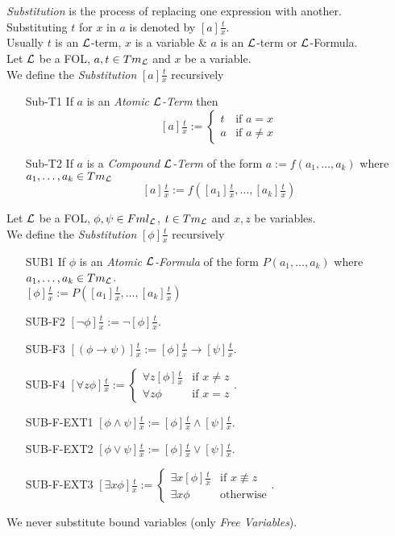 \documentclass[11pt,a4paper]{article}
\begin{document}
\textit{Substitution} is the process of replacing one expression with another.\\
Substituting $t$ for $x$ in $a$ is denoted by $[a]\frac{t}x$.\\
\nb Usually $t$ is an $\mathcal{L}$-term, $x$ is a variable \& $a$ is an $\mathcal{L}$-term or $\mathcal{L}$-Formula.\\

Let $\mathcal{L}$ be a FOL, $a,t\in Tm_{\mathcal{L}}$ and $x$ be a variable.\\
We define the \textit{Substitution} $[a]\frac{t}{x}$ recursively
\begin{itemize}
	\item[Sub-T1] If $a$ is an \textit{Atomic $\mathcal{L}$-Term} then
	$$[a]\tfrac{t}{x}:=\begin{cases}t&\text{if }a=x\\a&\text{if }a\neq x\end{cases}$$
	\item[Sub-T2] If $a$ is a \textit{Compound $\mathcal{L}$-Term} of the form $a:=f(a_1,\dots,a_k)$ where $a_1,\dots,a_k\in Tm_{\mathcal{L}}$
	$$[a]\tfrac{t}x:=f\left([a_1]\tfrac{t}x,\dots,[a_k]\tfrac{t}x\right)$$
\end{itemize}


Let $\mathcal{L}$ be a FOL, $\phi,\psi\in Fml_{\mathcal{L}}$, $t\in Tm_{\mathcal{L}}$ and $x,z$ be variables.\\
We define the \textit{Substitution} $[\phi]\frac{t}x$ recursively
\begin{itemize}
	\item[SUB1] If $\phi$ is an \textit{Atomic $\mathcal{L}$-Formula} of the form $P(a_1,\dots,a_k)$ where $a_1,\dots,a_k\in Tm_{\mathcal{L}}$.\\
	$[\phi]\frac{t}x:=P\left([a_1]\frac{t}x,\dots,[a_k]\frac{t}x\right)$
	\item[SUB-F2] $[\neg\phi]\frac{t}x:=\neg[\phi]\frac{t}x$.
	\item[SUB-F3] $[(\phi\to\psi)]\frac{t}x:=[\phi]\frac{t}x\to[\psi]\frac{t}x$.
	\item[SUB-F4] $[\forall z\phi]\frac{t}x:=\begin{cases}\forall z[\phi]\frac{t}x&\text{if }x\neq z\\
\forall z\phi&\text{if }x=z\end{cases}$.
	\item[SUB-F-EXT1]$[\phi\wedge\psi]\frac{t}{x}:=[\phi]\frac{t}x\wedge[\psi]\frac{t}x$.
	\item[SUB-F-EXT2]$[\phi\vee\psi]\frac{t}{x}:=[\phi]\frac{t}x\vee[\psi]\frac{t}x$.
	\item[SUB-F-EXT3] $[\exists x\phi]\frac{t}x:=\begin{cases}\exists x[\phi]\frac{t}{x}&\text{if }x\not\equiv z\\\exists x\phi&\text{otherwise}\end{cases}$.
\end{itemize}
\nb We never substitute bound variables (only \textit{Free Variables}).\\
\end{document}
